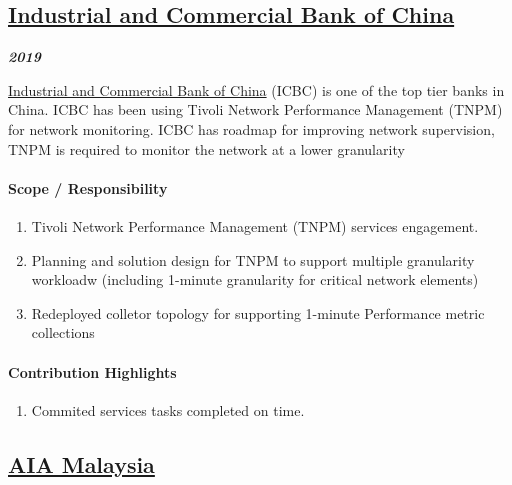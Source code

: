 \documentclass[
]{article}
\providecommand{\tightlist}{%
  \setlength{\itemsep}{0pt}\setlength{\parskip}{0pt}}
\begin{document}
\hypertarget{industrial-and-commercial-bank-of-china}{%
\subsection{\texorpdfstring{\href{http://www.icbc-ltd.com/icbcltd/en/}{Industrial
and Commercial Bank of
China}}{Industrial and Commercial Bank of China}}\label{industrial-and-commercial-bank-of-china}}

\textbf{\emph{2019}}

\href{http://www.icbc-ltd.com/icbcltd/en/}{Industrial and Commercial
Bank of China} (ICBC) is one of the top tier banks in China. ICBC has
been using Tivoli Network Performance Management (TNPM) for network
monitoring. ICBC has roadmap for improving network supervision, TNPM is
required to monitor the network at a lower granularity

\hypertarget{scope-responsibility-4}{%
\paragraph{Scope / Responsibility}\label{scope-responsibility-4}}

\begin{enumerate}
\def\labelenumi{\arabic{enumi}.}
\tightlist
\item
  Tivoli Network Performance Management (TNPM) services engagement.
\item
  Planning and solution design for TNPM to support multiple granularity
  workloadw (including 1-minute granularity for critical network
  elements)
\item
  Redeployed colletor topology for supporting 1-minute Performance
  metric collections
\end{enumerate}

\hypertarget{contribution-highlights-4}{%
\paragraph{Contribution Highlights}\label{contribution-highlights-4}}

\begin{enumerate}
\def\labelenumi{\arabic{enumi}.}
\tightlist
\item
  Commited services tasks completed on time.
\end{enumerate}

\hypertarget{aia-malaysia}{%
\subsection{\texorpdfstring{\href{https://www.aia.com.my/en/index.html}{AIA
Malaysia}}{AIA Malaysia}}\label{aia-malaysia}}
\end{document}
